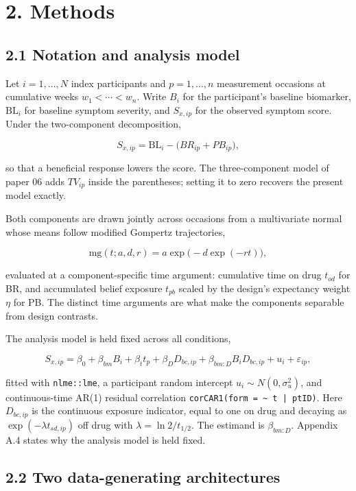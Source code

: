 \documentclass[
  11pt,
]{article}
\begin{document}
\section{2. Methods}

\subsection{2.1 Notation and analysis model}

Let \(i = 1, \dots, N\) index participants and \(p = 1, \dots, n\)
measurement occasions at cumulative weeks \(w_1 < \cdots < w_n\). Write
\(B_i\) for the participant's baseline biomarker, \(\mathrm{BL}_i\) for
baseline symptom severity, and \(S_{x,ip}\) for the observed symptom
score. Under the two-component decomposition,

\[
S_{x,ip} = \mathrm{BL}_i - \big( BR_{ip} + PB_{ip} \big),
\]

so that a beneficial response lowers the score. The three-component
model of paper 06 adds \(TV_{ip}\) inside the parentheses; setting it
to zero recovers the present model exactly.

Both components are drawn jointly across occasions from a
multivariate normal whose means follow modified Gompertz
trajectories,

\[
\mathrm{mg}(t; a, d, r) = a \exp\!\big(-d \exp(-r t)\big),
\]

evaluated at a component-specific time argument: cumulative time on
drug \(t_{od}\) for BR, and accumulated belief exposure \(t_{pb}\) scaled
by the design's expectancy weight \(\eta\) for PB. The distinct time
arguments are what make the components separable from design
contrasts.

The analysis model is held fixed across all conditions,

\[
S_{x,ip} = \beta_0 + \beta_{bm} B_i + \beta_t t_p
  + \beta_D D_{bc,ip} + \beta_{bm:D} B_i D_{bc,ip}
  + u_i + \varepsilon_{ip},
\]

fitted with \texttt{nlme::lme}, a participant random intercept \(u_i
\sim N(0, \sigma_u^2)\), and continuous-time AR(1) residual
correlation \texttt{corCAR1(form = \textasciitilde\ t | ptID)}. Here
\(D_{bc,ip}\) is the continuous exposure indicator, equal to one on
drug and decaying as \(\exp(-\lambda t_{sd,ip})\) off drug with
\(\lambda = \ln 2 / t_{1/2}\). The estimand is \(\beta_{bm:D}\).
Appendix A.4 states why the analysis model is held fixed.

\subsection{2.2 Two data-generating architectures}
\end{document}
